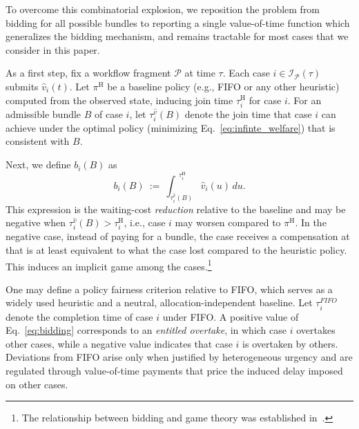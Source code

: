 \documentclass[letterpaper]{article}
\begin{document}
To overcome this combinatorial explosion, we reposition the problem
from bidding for all possible bundles to reporting 
a single value-of-time function which generalizes the bidding mechanism, 
and remains tractable for most cases
that we consider in this paper.


As a first step, fix a workflow fragment $\mathcal{P}$ at time $\tau$.
Each case $i\in\mathcal{I}_\mathcal{P}(\tau)$ submits $\hat v_i(t)$.
Let $\pi^{\mathrm{H}}$ be a baseline policy
(e.g., FIFO or any other heuristic) computed from the observed state, inducing join time $\tau_i^{\mathrm{H}}$ for case $i$.
For an admissible bundle $B$ of case $i$, let $\tau_i^{\hat v}(B)$ denote the
join time that case $i$ can achieve under the optimal policy (minimizing Eq.~\eqref{eq:infinte_welfare})
that is consistent with $B$.


Next, we define $b_i(B)$ as 
\begin{equation} \label{eq:bidding}
\quad b_i(B)\ :=\ \int_{\tau_i^{\hat v}(B)}^{\ \ \tau_i^{\mathrm{H}}}\! \hat v_i(u)\,du.\quad
\end{equation} 
This expression is the waiting-cost \emph{reduction}
relative to the baseline and may be negative when $\tau_i^{\hat v}(B)>\tau_i^{\mathrm{H}}$, i.e., case  
$i$ may worsen compared to $\pi^{\mathrm{H}}$. In the negative case, instead of paying for a bundle, 
the case receives a compensation at that is at
least equivalent to what the case lost compared to the heuristic policy. 
This induces an implicit game among the cases.\footnote{The relationship between
bidding and game theory was established in~\citep{lui1985bribery}.}

One may define a policy fairness criterion relative to FIFO, which serves as a widely used heuristic and a neutral, allocation-independent baseline. Let $\tau_i^{FIFO}$ denote the completion time of case $i$ under FIFO. A positive value of Eq.~\eqref{eq:bidding} corresponds to an \emph{entitled overtake}, in which case $i$ overtakes other cases, while a negative value indicates that case $i$ is overtaken by others. Deviations from FIFO arise only when justified by heterogeneous urgency and are regulated through value-of-time payments that price the induced delay imposed on other cases.
\end{document}
